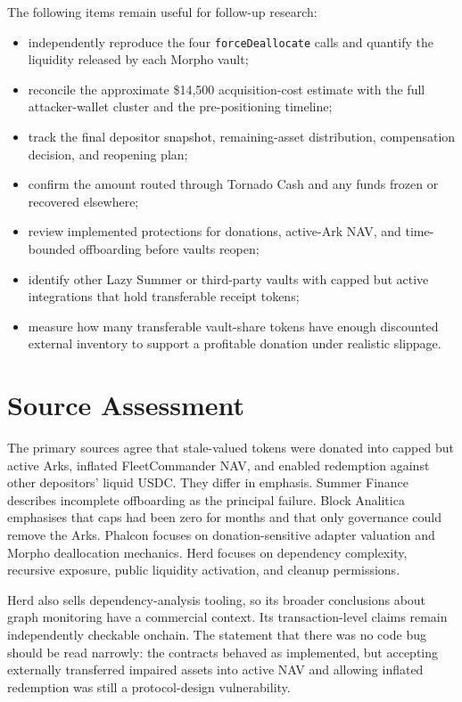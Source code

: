 \documentclass[11pt]{article}
\begin{document}
The following items remain useful for follow-up research:
\begin{itemize}
    \item independently reproduce the four \texttt{forceDeallocate} calls and quantify the liquidity released by each Morpho vault;
    \item reconcile the approximate \$14,500 acquisition-cost estimate with the full attacker-wallet cluster and the pre-positioning timeline;
    \item track the final depositor snapshot, remaining-asset distribution, compensation decision, and reopening plan;
    \item confirm the amount routed through Tornado Cash and any funds frozen or recovered elsewhere;
    \item review implemented protections for donations, active-Ark NAV, and time-bounded offboarding before vaults reopen;
    \item identify other Lazy Summer or third-party vaults with capped but active integrations that hold transferable receipt tokens;
    \item measure how many transferable vault-share tokens have enough discounted external inventory to support a profitable donation under realistic slippage.
\end{itemize}

\section{Source Assessment}

The primary sources agree that stale-valued tokens were donated into capped but active Arks, inflated FleetCommander NAV, and enabled redemption against other depositors' liquid USDC.  They differ in emphasis.  Summer Finance describes incomplete offboarding as the principal failure.  Block Analitica emphasises that caps had been zero for months and that only governance could remove the Arks.  Phalcon focuses on donation-sensitive adapter valuation and Morpho deallocation mechanics.  Herd focuses on dependency complexity, recursive exposure, public liquidity activation, and cleanup permissions.

Herd also sells dependency-analysis tooling, so its broader conclusions about graph monitoring have a commercial context.  Its transaction-level claims remain independently checkable onchain.  The statement that there was no code bug should be read narrowly: the contracts behaved as implemented, but accepting externally transferred impaired assets into active NAV and allowing inflated redemption was still a protocol-design vulnerability.
\end{document}
